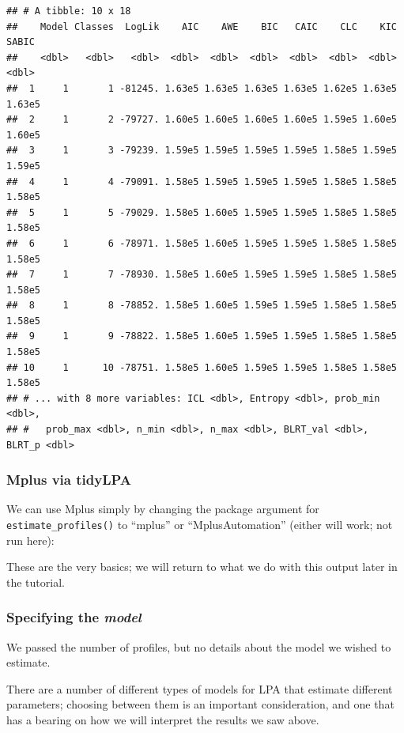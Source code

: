 \documentclass[
  english,
  man]{apa6}
\begin{document}
\begin{verbatim}
## # A tibble: 10 x 18
##    Model Classes  LogLik    AIC    AWE    BIC   CAIC    CLC    KIC  SABIC
##    <dbl>   <dbl>   <dbl>  <dbl>  <dbl>  <dbl>  <dbl>  <dbl>  <dbl>  <dbl>
##  1     1       1 -81245. 1.63e5 1.63e5 1.63e5 1.63e5 1.62e5 1.63e5 1.63e5
##  2     1       2 -79727. 1.60e5 1.60e5 1.60e5 1.60e5 1.59e5 1.60e5 1.60e5
##  3     1       3 -79239. 1.59e5 1.59e5 1.59e5 1.59e5 1.58e5 1.59e5 1.59e5
##  4     1       4 -79091. 1.58e5 1.59e5 1.59e5 1.59e5 1.58e5 1.58e5 1.58e5
##  5     1       5 -79029. 1.58e5 1.60e5 1.59e5 1.59e5 1.58e5 1.58e5 1.58e5
##  6     1       6 -78971. 1.58e5 1.60e5 1.59e5 1.59e5 1.58e5 1.58e5 1.58e5
##  7     1       7 -78930. 1.58e5 1.60e5 1.59e5 1.59e5 1.58e5 1.58e5 1.58e5
##  8     1       8 -78852. 1.58e5 1.60e5 1.59e5 1.59e5 1.58e5 1.58e5 1.58e5
##  9     1       9 -78822. 1.58e5 1.60e5 1.59e5 1.59e5 1.58e5 1.58e5 1.58e5
## 10     1      10 -78751. 1.58e5 1.60e5 1.59e5 1.59e5 1.58e5 1.58e5 1.58e5
## # ... with 8 more variables: ICL <dbl>, Entropy <dbl>, prob_min <dbl>,
## #   prob_max <dbl>, n_min <dbl>, n_max <dbl>, BLRT_val <dbl>, BLRT_p <dbl>
\end{verbatim}

\hypertarget{mplus-via-tidylpa}{%
\subsubsection{Mplus via tidyLPA}\label{mplus-via-tidylpa}}

We can use Mplus simply by changing the package argument for
\texttt{estimate\_profiles()} to \enquote{mplus} or \enquote{MplusAutomation} (either will work; not run here):

These are the very basics; we will return to what we do with this output later in the tutorial.

\hypertarget{specifying-the-model}{%
\subsubsection{\texorpdfstring{Specifying the \emph{model}}{Specifying the model}}\label{specifying-the-model}}

We passed the number of profiles, but no details about the model we wished to estimate.

There are a number of different types of models for LPA that estimate different parameters; choosing
between them is an important consideration, and one that has a bearing on how we will interpret the results we saw above.
\end{document}
